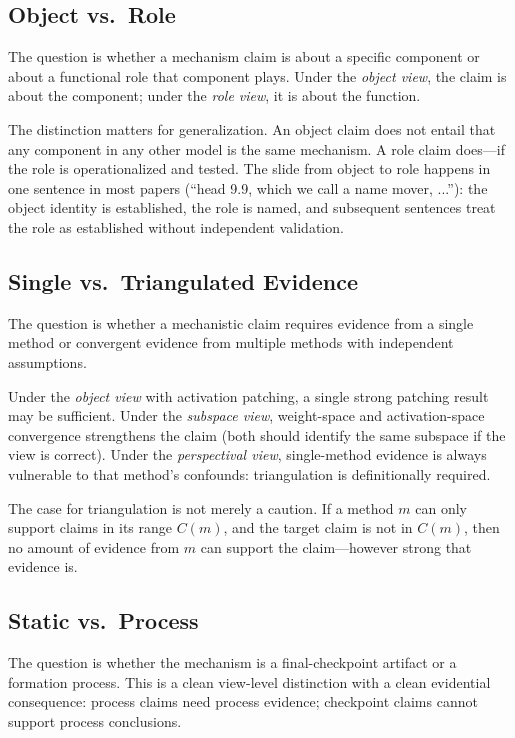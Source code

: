 \documentclass[11pt]{article}
\theoremstyle{remark}
\begin{document}
\subsection{Object vs.\ Role}

The question is whether a mechanism claim is about a specific component
or about a functional role that component plays.  Under the \emph{object
view}, the claim is about the component; under the \emph{role view},
it is about the function.

The distinction matters for generalization.  An object claim does not
entail that any component in any other model is the same mechanism.  A
role claim does---if the role is operationalized and tested.  The slide
from object to role happens in one sentence in most papers (``head 9.9,
which we call a name mover, ...''): the object identity is
established, the role is named, and subsequent sentences treat the role
as established without independent validation.

\subsection{Single vs.\ Triangulated Evidence}

The question is whether a mechanistic claim requires evidence from a
single method or convergent evidence from multiple methods with
independent assumptions.

Under the \emph{object view} with activation patching, a single strong
patching result may be sufficient.  Under the \emph{subspace view},
weight-space and activation-space convergence strengthens the claim
(both should identify the same subspace if the view is correct).
Under the \emph{perspectival view}, single-method evidence is always
vulnerable to that method's confounds: triangulation is definitionally
required.

The case for triangulation is not merely a caution.  If a method $m$
can only support claims in its range $C(m)$, and the target claim is
not in $C(m)$, then no amount of evidence from $m$ can support the
claim---however strong that evidence is.

\subsection{Static vs.\ Process}

The question is whether the mechanism is a final-checkpoint artifact
or a formation process.  This is a clean view-level distinction with
a clean evidential consequence: process claims need process evidence;
checkpoint claims cannot support process conclusions.
\end{document}
